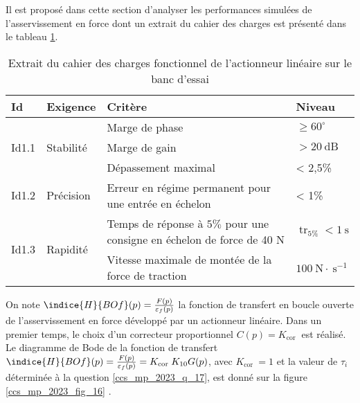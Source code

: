 \ifprof
\else

Il est proposé dans cette section d'analyser les performances simulées de l'asservissement en force dont un extrait du cahier des charges est présenté dans le tableau \ref{ccs_mp_2023_tab_05}.

\begin{table}[h]
\begin{center}
\begin{tabular}{llll}
\hline
\textbf{Id} & \textbf{Exigence} & \textbf{Critère} & \textbf{Niveau} \\
\hline
\multirow[t]{3}{*}{Id1.1} & \multirow[t]{3}{*}{Stabilité} & Marge de phase & $\geqslant 60^{\circ}$ \\

 &  & Marge de gain & $>20 \mathrm{~dB}$ \\

 &  & Dépassement maximal & < 2,5\% \\
\hline
Id1.2 & Précision & Erreur en régime permanent pour une entrée en échelon & < 1\% \\
\hline
\multirow[t]{2}{*}{Id1.3} & \multirow[t]{2}{*}{Rapidité} & Temps de réponse à $5 \%$ pour une consigne en échelon de force de 40 N & $\operatorname{tr}_{5 \%}<1 \mathrm{~s}$ \\

 &  & Vitesse maximale de montée de la force de traction & $100 \mathrm{~N} \cdot \mathrm{~s}^{-1}$ \\
\hline
\end{tabular}
\caption{\label{ccs_mp_2023_tab_05}Extrait du cahier des charges fonctionnel de l'actionneur linéaire sur le banc d'essai}
\end{center}
\end{table}

On note $\indice{H}{B O f}(p)=\frac{F(p)}{\varepsilon_{f}(p)}$ la fonction de transfert en boucle ouverte de l'asservissement en force développé par un actionneur linéaire. Dans un premier temps, le choix d'un correcteur proportionnel $C(p)=K_{\text {cor }}$ est réalisé. Le diagramme de Bode de la fonction de transfert $\indice{H}{B O f}(p)=\frac{F(p)}{\varepsilon_{f}(p)}=K_{\text {cor }} K_{10} G(p)$, avec $K_{\text {cor }}=1$ et la valeur de $\tau_{i}$ déterminée à la question \ref{ccs_mp_2023_q_17}, est donné sur la figure \ref{ccs_mp_2023_fig_16} .



